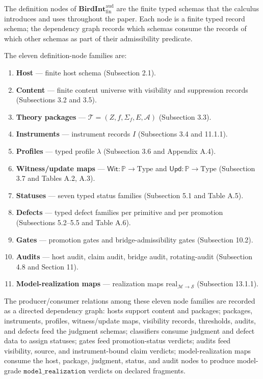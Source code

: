 \documentclass[11pt]{article}
\providecommand{\tightlist}{}
\theoremstyle{definition}
\begin{document}
The definition nodes of \(\mathbf{BirdInt}^{\mathrm{aud}}_{\mathrm{fin}}\) are the finite typed schemas that the calculus introduces and uses throughout the paper. Each node is a finite typed record schema; the dependency graph records which schemas consume the records of which other schemas as part of their admissibility predicate.

The eleven definition-node families are:

\begin{enumerate}
\def\labelenumi{\arabic{enumi}.}
\tightlist
\item
  \textbf{Host} --- finite host schema (Subsection 2.1).
\item
  \textbf{Content} --- finite content universe with visibility and suppression records (Subsections 3.2 and 3.5).
\item
  \textbf{Theory packages} --- \(\mathcal T=(Z,f,\Sigma_{f},E,\mathcal A)\) (Subsection 3.3).
\item
  \textbf{Instruments} --- instrument records \(I\) (Subsections 3.4 and 11.1.1).
\item
  \textbf{Profiles} --- typed profile \(\lambda\) (Subsection 3.6 and Appendix A.4).
\item
  \textbf{Witness/update maps} --- \(\mathsf{Wit}:\mathbb P\to\mathrm{Type}\) and \(\mathsf{Upd}:\mathbb P\to\mathrm{Type}\) (Subsection 3.7 and Tables A.2, A.3).
\item
  \textbf{Statuses} --- seven typed status families (Subsection 5.1 and Table A.5).
\item
  \textbf{Defects} --- typed defect families per primitive and per promotion (Subsections 5.2--5.5 and Table A.6).
\item
  \textbf{Gates} --- promotion gates and bridge-admissibility gates (Subsection 10.2).
\item
  \textbf{Audits} --- host audit, claim audit, bridge audit, rotating-audit (Subsection 4.8 and Section 11).
\item
  \textbf{Model-realization maps} --- realization maps \(\mathrm{real}_{\mathcal M\to\mathcal S}\) (Subsection 13.1.1).
\end{enumerate}

The producer/consumer relations among these eleven node families are recorded as a directed dependency graph: hosts support content and packages; packages, instruments, profiles, witness/update maps, visibility records, thresholds, audits, and defects feed the judgment schemas; classifiers consume judgment and defect data to assign statuses; gates feed promotion-status verdicts; audits feed visibility, source, and instrument-bound claim verdicts; model-realization maps consume the host, package, judgment, status, and audit nodes to produce model-grade \(\texttt{model\_realization}\) verdicts on declared fragments.
\end{document}
